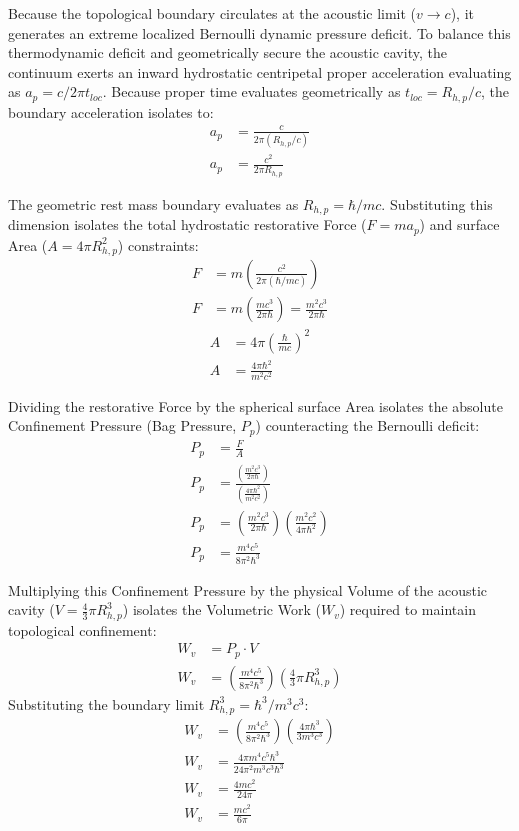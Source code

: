 \documentclass[11pt, a4paper]{article}
\begin{document}
Because the topological boundary circulates at the acoustic limit ($v \to c$), it generates an extreme localized Bernoulli dynamic pressure deficit. To balance this thermodynamic deficit and geometrically secure the acoustic cavity, the continuum exerts an inward hydrostatic centripetal proper acceleration evaluating as $a_p = c/2\pi t_{loc}$. Because proper time evaluates geometrically as $t_{loc} = R_{h,p}/c$, the boundary acceleration isolates to:
\begin{align}
    a_p &= \frac{c}{2\pi (R_{h,p}/c)} \\
    a_p &= \frac{c^2}{2\pi R_{h,p}}
\end{align}

The geometric rest mass boundary evaluates as $R_{h,p} = \hbar/mc$. Substituting this dimension isolates the total hydrostatic restorative Force ($F = m a_p$) and surface Area ($A = 4\pi R_{h,p}^2$) constraints:
\begin{align}
    F &= m \left( \frac{c^2}{2\pi (\hbar/mc)} \right) \\
    F &= m \left( \frac{m c^3}{2\pi \hbar} \right) = \frac{m^2 c^3}{2\pi \hbar}
\end{align}
\begin{align}
    A &= 4\pi \left( \frac{\hbar}{mc} \right)^2 \\
    A &= \frac{4\pi \hbar^2}{m^2 c^2}
\end{align}

Dividing the restorative Force by the spherical surface Area isolates the absolute Confinement Pressure (Bag Pressure, $P_p$) counteracting the Bernoulli deficit:
\begin{align}
    P_p &= \frac{F}{A} \\
    P_p &= \frac{\left( \frac{m^2 c^3}{2\pi \hbar} \right)}{\left( \frac{4\pi \hbar^2}{m^2 c^2} \right)} \\
    P_p &= \left( \frac{m^2 c^3}{2\pi \hbar} \right) \left( \frac{m^2 c^2}{4\pi \hbar^2} \right) \\
    P_p &= \frac{m^4 c^5}{8\pi^2 \hbar^3}
\end{align}

Multiplying this Confinement Pressure by the physical Volume of the acoustic cavity ($V = \frac{4}{3}\pi R_{h,p}^3$) isolates the Volumetric Work ($W_v$) required to maintain topological confinement:
\begin{align}
    W_v &= P_p \cdot V \\
    W_v &= \left( \frac{m^4 c^5}{8\pi^2 \hbar^3} \right) \left( \frac{4}{3}\pi R_{h,p}^3 \right)
\end{align}
Substituting the boundary limit $R_{h,p}^3 = \hbar^3 / m^3 c^3$:
\begin{align}
    W_v &= \left( \frac{m^4 c^5}{8\pi^2 \hbar^3} \right) \left( \frac{4\pi \hbar^3}{3 m^3 c^3} \right) \\
    W_v &= \frac{4\pi m^4 c^5 \hbar^3}{24\pi^2 m^3 c^3 \hbar^3} \\
    W_v &= \frac{4 m c^2}{24 \pi} \\
    W_v &= \frac{m c^2}{6\pi}
\end{align}
\end{document}
